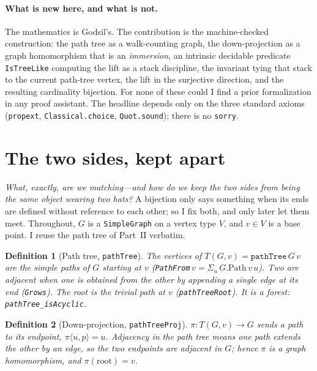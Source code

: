\documentclass[11pt]{article}
\newtheorem{definition}{Definition}
\newcommand{\lean}[1]{\texttt{#1}}
\begin{document}
\paragraph{What is new here, and what is not.} The mathematics is Godsil's. The contribution is the
machine-checked construction: the path tree as a walk-counting graph, the down-projection as a graph
homomorphism that is an \emph{immersion}, an intrinsic decidable predicate \lean{IsTreeLike} computing
the lift as a stack discipline, the invariant tying that stack to the current path-tree vertex, the
lift in the surjective direction, and the resulting cardinality bijection. For none of these could I
find a prior formalization in any proof assistant. The headline depends only on the three standard
axioms (\lean{propext}, \lean{Classical.choice}, \lean{Quot.sound}); there is no \lean{sorry}.

\section{The two sides, kept apart}
\label{sec:objects}

\emph{What, exactly, are we matching---and how do we keep the two sides from being the same object
wearing two hats?} A bijection only says something when its ends are defined without reference to each
other; so I fix both, and only later let them meet. Throughout, $G$ is a \lean{SimpleGraph} on a
vertex type $V$, and $v\in V$ is a base point. I reuse the path tree of Part~II verbatim.

\begin{definition}[Path tree, \lean{pathTree}]
The vertices of $T(G,v)=\lean{pathTree}\,G\,v$ are the simple paths of $G$ starting at $v$
(\lean{PathFrom}\,$v=\Sigma_{u}\,G.\mathrm{Path}\,v\,u$). Two are adjacent when one is obtained from
the other by appending a single edge at its end (\lean{Grows}). The root is the trivial path at $v$
(\lean{pathTreeRoot}). It is a forest: \lean{pathTree\_isAcyclic}.
\end{definition}

\begin{definition}[Down-projection, \lean{pathTreeProj}]
$\pi\colon T(G,v)\to G$ sends a path to its endpoint, $\pi\langle u,p\rangle=u$. Adjacency in the
path tree means one path extends the other by an edge, so the two endpoints are adjacent in $G$;
hence $\pi$ is a graph homomorphism, and $\pi(\mathrm{root})=v$.
\end{definition}
\end{document}
